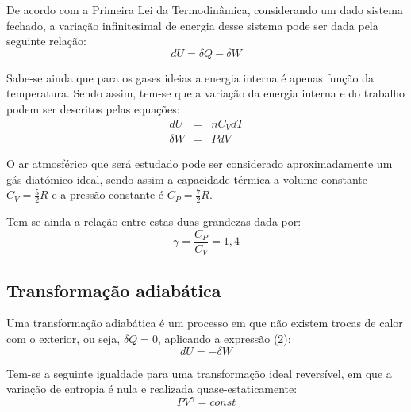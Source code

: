 \documentclass[9pt]{extarticle}
\begin{document}
\begin{multicols}{2}
\par De acordo com a Primeira Lei da Termodinâmica, considerando um dado sistema fechado, a variação infinitesimal de energia desse sistema pode ser dada pela seguinte relação:
\begin{equation}
dU = \delta Q - \delta W 
\end{equation}
\begin{center}
\par{}
\end{center}
\par Sabe-se ainda que para os gases ideias a energia interna é apenas função da temperatura. Sendo assim, tem-se que a variação da energia interna e do trabalho podem ser descritos pelas equações:
\begin{eqnarray} \label{dU} 
dU &=& n C_V dT \\
\delta W &=& P dV  
\end{eqnarray}
\par O ar atmosférico que será estudado pode ser considerado aproximadamente um gás diatómico ideal, sendo assim a capacidade térmica a volume constante $C_V = \frac{5}{2} R$ e a pressão constante é $C_P = \frac{7}{2} R$.
\par Tem-se ainda a relação entre estas duas grandezas dada por:
\begin{equation}
\gamma = \frac{C_P}{C_V} = 1,4
\end{equation}

\subsection*{Transformação adiabática}

\par Uma transformação adiabática é um processo em que não existem trocas de calor com o exterior, ou seja, $\delta Q = 0$, aplicando a expressão (2):
\begin{equation} \label{adia}
dU = -\delta W 
\end{equation}
\par Tem-se a seguinte igualdade para uma transformação ideal reversível, em que a variação de entropia é nula e realizada quase-estaticamente: 
\begin{equation} \label{alpha}
PV^{\gamma} = const
\end{equation}


\end{multicols}
\end{document}
